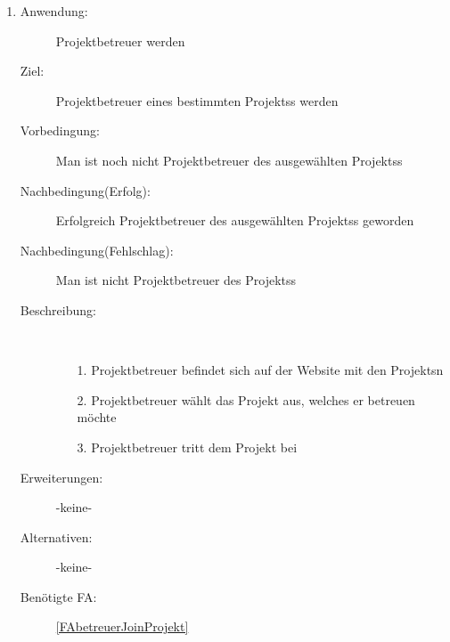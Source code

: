 \documentclass[parskip=full]{scrartcl}
\newcommand{\swtLabel}[1]{\textbf{/#1\arabic*0/}}
\begin{document}
\begin{enumerate} [label=\swtLabel{B}]
 
  \item \label{UCbetreuerJoinProjekt}
	\begin{description}
  		\item[Anwendung:] \gls{Projektbetreuer} werden
  		\item[Ziel:] \gls{Projektbetreuer} eines bestimmten \glspl{Projekt}s werden
  		\item[Vorbedingung:] Man ist noch nicht \gls{Projektbetreuer} des ausgewählten \glspl{Projekt}s
  		\item[Nachbedingung(Erfolg):] Erfolgreich \gls{Projektbetreuer} des ausgewählten
  		\glspl{Projekt}s geworden
  		\item[Nachbedingung(Fehlschlag):] Man ist nicht \gls{Projektbetreuer} des \glspl{Projekt}s
  		\item[Beschreibung:]~
  	\begin{enumerate} 
  	  \item[1.] \gls{Projektbetreuer} befindet sich auf der Website mit den \glspl{Projekt}n
  	  \item[2.] \gls{Projektbetreuer} wählt das \gls{Projekt} aus, welches er betreuen möchte
  	  \item[3.] \gls{Projektbetreuer} tritt dem \gls{Projekt} bei
  	\end{enumerate}
  	\item[Erweiterungen:] -keine-
  	\item[Alternativen:] -keine-
  	\item[Benötigte FA:] \ref{FAbetreuerJoinProjekt}
  \end{description}
  

\end{enumerate}
\end{document}
